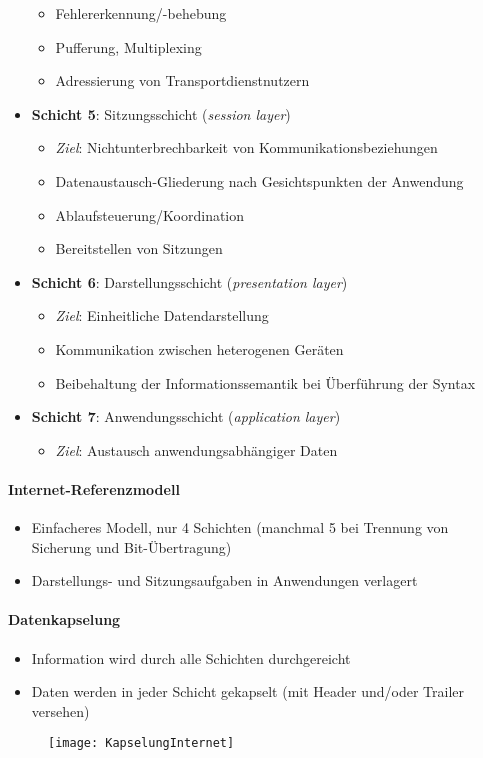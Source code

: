 \begin{itemize}
\begin{itemize}
    \item Fehlererkennung/-behebung
    \item Pufferung, Multiplexing
    \item Adressierung von Transportdienstnutzern
  \end{itemize}
  \item \textbf{Schicht 5}: Sitzungsschicht (\emph{session layer})
  \begin{itemize}
    \item \emph{Ziel}: Nichtunterbrechbarkeit von Kommunikationsbeziehungen
    \item Datenaustausch-Gliederung nach Gesichtspunkten der Anwendung
    \item Ablaufsteuerung/Koordination
    \item Bereitstellen von Sitzungen
  \end{itemize}
  \item \textbf{Schicht 6}: Darstellungsschicht (\emph{presentation layer})
  \begin{itemize}
    \item \emph{Ziel}: Einheitliche Datendarstellung
    \item Kommunikation zwischen heterogenen Geräten
    \item Beibehaltung der Informationssemantik bei Überführung der Syntax
  \end{itemize}
  \item \textbf{Schicht 7}: Anwendungsschicht (\emph{application layer})
  \begin{itemize}
    \item \emph{Ziel}: Austausch anwendungsabhängiger Daten
  \end{itemize}
\end{itemize}

\paragraph{Internet-Referenzmodell}
\begin{itemize}
  \item Einfacheres Modell, nur 4 Schichten (manchmal 5 bei Trennung von Sicherung und Bit-Übertragung)
  \item Darstellungs- und Sitzungsaufgaben in Anwendungen verlagert
\end{itemize}

\paragraph{Datenkapselung}
\begin{itemize}
	\item Information wird durch alle Schichten durchgereicht
	\item Daten werden in jeder Schicht gekapselt (mit Header und/oder Trailer versehen)
\end{itemize}
\begin{figure}[H]\centering\label{KapselungInternet}\texttt{[image: KapselungInternet]}\end{figure}

